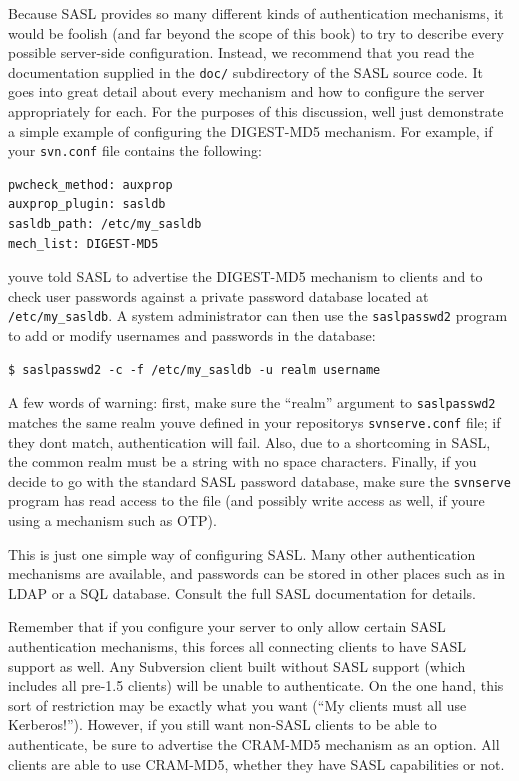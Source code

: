 Because SASL provides so many different kinds of authentication
mechanisms, it would be foolish (and far beyond the scope of this book)
to try to describe every possible server-side configuration. Instead, we
recommend that you read the documentation supplied in the \texttt{doc/}
subdirectory of the SASL source code. It goes into great detail about
every mechanism and how to configure the server appropriately for each.
For the purposes of this discussion, we\textquotesingle ll just
demonstrate a simple example of configuring the DIGEST-MD5 mechanism.
For example, if your \texttt{svn.conf} file contains the following:

\begin{verbatim}
pwcheck_method: auxprop
auxprop_plugin: sasldb
sasldb_path: /etc/my_sasldb
mech_list: DIGEST-MD5
\end{verbatim}

you\textquotesingle ve told SASL to advertise the DIGEST-MD5 mechanism
to clients and to check user passwords against a private password
database located at \texttt{/etc/my\_sasldb}. A system administrator can
then use the \texttt{saslpasswd2} program to add or modify usernames and
passwords in the database:

\begin{verbatim}
$ saslpasswd2 -c -f /etc/my_sasldb -u realm username
\end{verbatim}

A few words of warning: first, make sure the ``realm'' argument to
\texttt{saslpasswd2} matches the same realm you\textquotesingle ve
defined in your repository\textquotesingle s \texttt{svnserve.conf}
file; if they don\textquotesingle t match, authentication will fail.
Also, due to a shortcoming in SASL, the common realm must be a string
with no space characters. Finally, if you decide to go with the standard
SASL password database, make sure the \texttt{svnserve} program has read
access to the file (and possibly write access as well, if
you\textquotesingle re using a mechanism such as OTP).

This is just one simple way of configuring SASL. Many other
authentication mechanisms are available, and passwords can be stored in
other places such as in LDAP or a SQL database. Consult the full SASL
documentation for details.

Remember that if you configure your server to only allow certain SASL
authentication mechanisms, this forces all connecting clients to have
SASL support as well. Any Subversion client built without SASL support
(which includes all pre-1.5 clients) will be unable to authenticate. On
the one hand, this sort of restriction may be exactly what you want
(``My clients must all use Kerberos!''). However, if you still want
non-SASL clients to be able to authenticate, be sure to advertise the
CRAM-MD5 mechanism as an option. All clients are able to use CRAM-MD5,
whether they have SASL capabilities or not.

